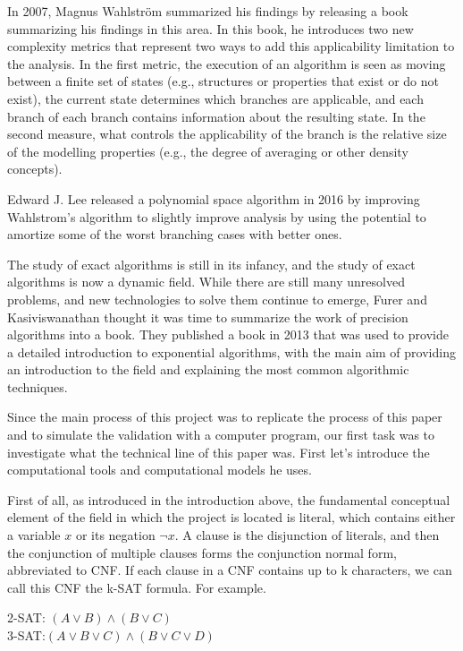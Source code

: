 \documentclass{sigchi}
\begin{document}
In 2007, Magnus Wahlström summarized his findings by releasing a book summarizing his findings in this area.\cite{Wahlstrom} In this book, he introduces two new complexity metrics that represent two ways to add this applicability limitation to the analysis. In the first metric, the execution of an algorithm is seen as moving between a finite set of states (e.g., structures or properties that exist or do not exist), the current state determines which branches are applicable, and each branch of each branch contains information about the resulting state. In the second measure, what controls the applicability of the branch is the relative size of the modelling properties (e.g., the degree of averaging or other density concepts).


Edward J. Lee released a polynomial space algorithm in 2016
\cite{Lee} by improving Wahlstrom's algorithm to slightly improve analysis by using the potential to amortize some of the worst branching cases with better ones. 

The study of exact algorithms is still in its infancy, and the study of exact algorithms is now a dynamic field. While there are still many unresolved problems, and new technologies to solve them continue to emerge, Furer and Kasiviswanathan thought it was time to summarize the work of precision algorithms into a book. They published a book in 2013 that was used to provide a detailed introduction to exponential algorithms, with the main aim of providing an introduction to the field and explaining the most common algorithmic techniques.\cite{10.1145/2428556.2428575}

Since the main process of this project was to replicate the process of this paper and to simulate the validation with a computer program, our first task was to investigate what the technical line of this paper was. First let's introduce the computational tools and computational models he uses.

First of all, as introduced in the introduction above, the fundamental conceptual element of the field in which the project is located is literal, which contains either a variable $x$ or its negation $\neg x$. A clause is the disjunction of literals, and then the conjunction of multiple clauses forms the conjunction normal form, abbreviated to CNF. If each clause in a CNF contains up to k characters, we can call this CNF the k-SAT formula. For example.
\begin{center}
	2-SAT:  $\left ( A \vee B \right )\wedge \left ( B \vee C \right ) $\\3-SAT:$\left ( A \vee B\vee C \right )\wedge \left ( B \vee C\vee D \right )$
\end{center}
\end{document}
